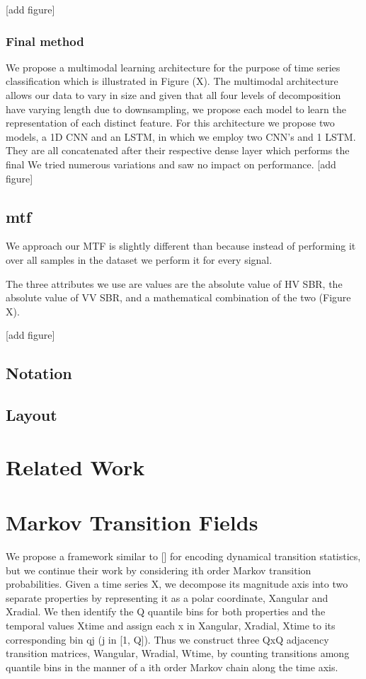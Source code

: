\documentclass{turabian-thesis}
\begin{document}
[add figure]

\subsection{Final method}
We propose a multimodal learning architecture for the purpose of time series classification which is illustrated in Figure (X). The multimodal architecture allows our data to vary in size and given that all four levels of decomposition have varying length due to downsampling, we propose each model to learn the representation of each distinct feature. For this architecture we propose two models, a 1D CNN and an LSTM, in which we employ two CNN’s and 1 LSTM. They are all concatenated after their respective dense layer which performs the final   We tried numerous variations and saw no impact on performance. 
[add figure]



\section{mtf}

We approach our MTF is slightly different than  because instead of performing it over all samples in the dataset we perform it for every signal. 

The three attributes we use are values are the absolute value of HV SBR, the absolute value of VV SBR, and a mathematical combination of the two (Figure X).



[add figure]

\section{Notation}

\section{Layout}



\chapter{Related Work}
 

\chapter{Markov Transition Fields}
We propose a framework similar to [] for encoding dynamical transition statistics,
but we continue their work by considering ith order Markov transition probabilities.
Given a time series X, we decompose its magnitude axis into two separate
properties by representing it as a polar coordinate, Xangular and Xradial. We then
identify the Q quantile bins for both properties and the temporal values Xtime
and assign each x in Xangular, Xradial, Xtime to its corresponding bin qj (j in
[1, Q]). Thus we construct three QxQ adjacency transition matrices, Wangular,
Wradial, Wtime, by counting transitions among quantile bins in the manner of a
ith order Markov chain along the time axis.
\end{document}
